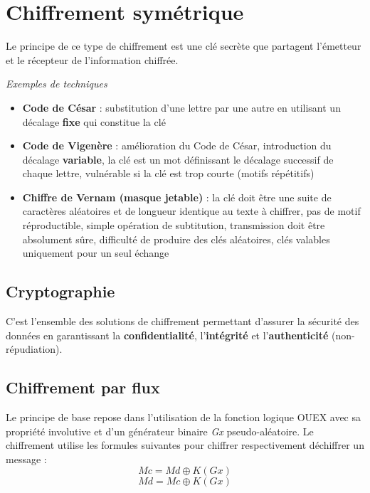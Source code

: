\documentclass[12pt, a4paper]{article}
\begin{document}
	\section{Chiffrement symétrique}
	Le principe de ce type de chiffrement est une clé secrète que partagent l'émetteur et le récepteur de l'information chiffrée.
	\par
	\textit{Exemples de techniques}
	\begin{itemize}
		\item \textbf{Code de César} : substitution d'une lettre par une autre en utilisant un décalage \textbf{fixe} qui constitue la clé
		\item \textbf{Code de Vigenère} : amélioration du Code de César, introduction du décalage \textbf{variable}, la clé est un mot définissant le décalage successif de chaque lettre, vulnérable si la clé est trop courte (motifs répétitifs)
		\item \textbf{Chiffre de Vernam (masque jetable)} : la clé doit être une suite de caractères aléatoires et de longueur identique au texte à chiffrer, pas de motif réproductible, simple opération de subtitution, transmission doit être absolument sûre, difficulté de produire des clés aléatoires, clés valables uniquement pour un seul échange
	\end{itemize}
	\subsection{Cryptographie}
	C'est l'ensemble des solutions de chiffrement permettant d'assurer la sécurité des données en garantissant la \textbf{confidentialité}, l'\textbf{intégrité} et l'\textbf{authenticité} (non-répudiation).
	\subsection{Chiffrement par flux}
	Le principe de base repose dans l'utilisation de la fonction logique OUEX avec sa propriété involutive et d'un générateur binaire \textit{Gx} pseudo-aléatoire. Le chiffrement utilise les formules suivantes pour chiffrer respectivement déchiffrer un message :
	\[ Mc = Md \oplus K(Gx) \]
	\[ Md = Mc \oplus K(Gx) \]
\end{document}
